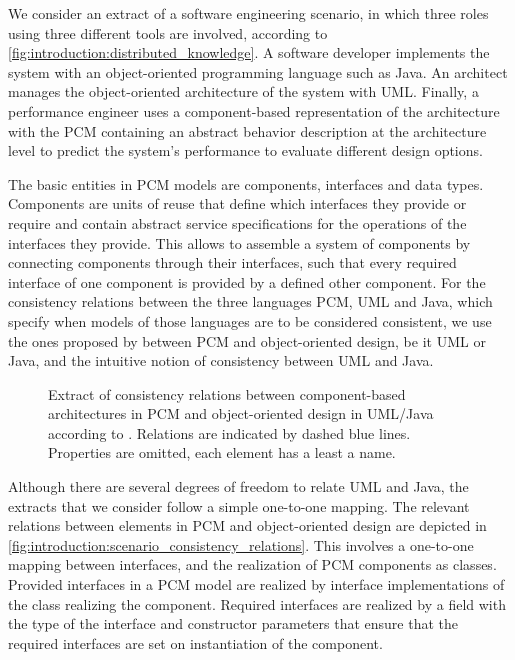 We consider an extract of a software engineering scenario, in which three roles using three different tools are involved, according to \autoref{fig:introduction:distributed_knowledge}. 
A software developer implements the system with an object-oriented programming language such as Java.
An architect manages the object-oriented architecture of the system with \gls{UML}. 
Finally, a performance engineer uses a component-based representation of the architecture with the \gls{PCM} containing an abstract behavior description at the architecture level to predict the system's performance to evaluate different design options.

The basic entities in \gls{PCM} models are components, interfaces and data types.
Components are units of reuse that define which interfaces they provide or require and contain abstract service specifications for the operations of the interfaces they provide.
This allows to assemble a system of components by connecting components through their interfaces, such that every required interface of one component is provided by a defined other component.
For the consistency relations between the three languages \gls{PCM}, \gls{UML} and Java, which specify when models of those languages are to be considered consistent, we use the ones proposed by \textcite{langhammer2017a} between \gls{PCM} and object-oriented design, be it \gls{UML} or Java, and the intuitive notion of consistency between \gls{UML} and Java.

\begin{figure}
    \centering
    
    \caption[Consistency relations for \acrshort{PCM} and \acrshort{UML}/Java]{Extract of consistency relations between component-based architectures in \gls{PCM} and object-oriented design in \gls{UML}/Java according to \cite{langhammer2017a}. Relations are indicated by dashed blue lines. Properties are omitted, each element has a least a name.}
    \label{fig:introduction:scenario_consistency_relations}
\end{figure}

Although there are several degrees of freedom to relate \gls{UML} and Java, the extracts that we consider follow a simple one-to-one mapping.
The relevant relations between elements in \gls{PCM} and object-oriented design are depicted in \autoref{fig:introduction:scenario_consistency_relations}.
This involves a one-to-one mapping between interfaces, and the realization of \gls{PCM} components as classes. 
Provided interfaces in a \gls{PCM} model are realized by interface implementations of the class realizing the component. 
Required interfaces are realized by a field with the type of the interface and constructor parameters that ensure that the required interfaces are set on instantiation of the component.

